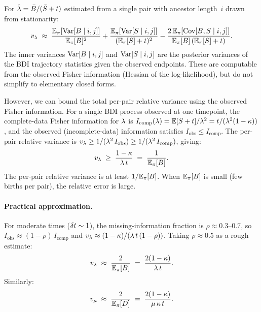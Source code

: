\begin{proposition}
\label{prop:inner-variance}
For $\hat{\lambda} = \bar B / (\bar S + t)$ estimated from
a single pair with ancestor length~$i$ drawn from stationarity:
\begin{equation}\label{eq:v-lambda-inner}
v_\lambda \;\approx\;
  \frac{\mathbb{E}_\pi[\mathrm{Var}[B \mid i, j]]}{\mathbb{E}_\pi[B]^2}
  + \frac{\mathbb{E}_\pi[\mathrm{Var}[S \mid i, j]]}{(\mathbb{E}_\pi[S] + t)^2}
  - \frac{2\,\mathbb{E}_\pi[\mathrm{Cov}[B, S \mid i, j]]}
         {\mathbb{E}_\pi[B]\,(\mathbb{E}_\pi[S] + t)}.
\end{equation}
The inner variances $\mathrm{Var}[B \mid i,j]$ and $\mathrm{Var}[S \mid i,j]$
are the posterior variances of the BDI trajectory statistics given
the observed endpoints.  These are computable from the observed
Fisher information (Hessian of the log-likelihood), but do not
simplify to elementary closed forms.

However, we can bound the total per-pair relative variance using
the observed Fisher information.
For a single BDI process observed at one timepoint, the
complete-data Fisher information for $\lambda$ is
$I_{\text{comp}}(\lambda) = \mathbb{E}[S + t]/\lambda^2
= t/(\lambda^2(1-\kappa))$,
and the observed (incomplete-data) information satisfies
$I_{\text{obs}} \leq I_{\text{comp}}$.
The per-pair relative variance is
$v_\lambda \geq 1/(\lambda^2\,I_{\text{obs}}) \geq 1/(\lambda^2\,I_{\text{comp}})$,
giving:
\begin{equation}\label{eq:v-lambda-bound}
v_\lambda \;\geq\; \frac{1-\kappa}{\lambda\,t}
  \;=\; \frac{1}{\mathbb{E}_\pi[B]}.
\end{equation}
The per-pair relative variance is at least $1/\mathbb{E}_\pi[B]$.
When $\mathbb{E}_\pi[B]$ is small (few births per pair),
the relative error is large.
\end{proposition}

\paragraph{Practical approximation.}
For moderate times ($\delta t \sim 1$), the missing-information
fraction is $\rho \approx 0.3$--$0.7$, so
$I_{\text{obs}} \approx (1-\rho)\,I_{\text{comp}}$
and $v_\lambda \approx (1-\kappa)/(\lambda\,t\,(1-\rho))$.
Taking $\rho \approx 0.5$ as a rough estimate:
\begin{equation}\label{eq:v-lambda-approx}
v_\lambda \;\approx\; \frac{2}{\mathbb{E}_\pi[B]}
  \;=\; \frac{2(1-\kappa)}{\lambda\,t}.
\end{equation}
Similarly:
\begin{equation}\label{eq:v-mu-approx}
v_\mu \;\approx\; \frac{2}{\mathbb{E}_\pi[D]}
  \;=\; \frac{2(1-\kappa)}{\mu\,\kappa\,t}.
\end{equation}

\ifdefined\MIXDOMPAPER
\fi
